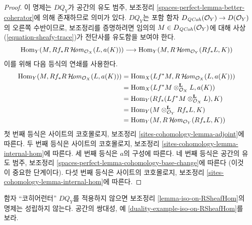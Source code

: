 \begin{proof}
이 명제는 $DQ_Y$가 공간의 유도 범주, 보조정리
\ref{spaces-perfect-lemma-better-coherator}에 의해 존재하므로 의미가 있다.
$DQ_Y$는 포함 함자
$D_{\mathit{QCoh}}(\mathcal{O}_Y) \to D(\mathcal{O}_Y)$의 오른쪽 수반이므로,
보조정리를 증명하려면 임의의
$M \in D_{\mathit{QCoh}}(\mathcal{O}_Y)$에 대해
사상 (\ref{equation-sheafy-trace})가 전단사를 유도함을 보여야 한다.
$$
\mathop{\mathrm{Hom}}\nolimits_Y(M, Rf_*R\mathop{\mathcal{H}\!\mathit{om}}\nolimits_{\mathcal{O}_X}(L, a(K)))
\longrightarrow
\mathop{\mathrm{Hom}}\nolimits_Y(M, R\mathop{\mathcal{H}\!\mathit{om}}\nolimits_{\mathcal{O}_Y}(Rf_*L, K))
$$
이를 위해 다음 등식의 연쇄를 사용한다.
\begin{align*}
\mathop{\mathrm{Hom}}\nolimits_Y(M, Rf_*R\mathop{\mathcal{H}\!\mathit{om}}\nolimits_{\mathcal{O}_X}(L, a(K)))
& =
\mathop{\mathrm{Hom}}\nolimits_X(Lf^*M, R\mathop{\mathcal{H}\!\mathit{om}}\nolimits_{\mathcal{O}_X}(L, a(K))) \\
& =
\mathop{\mathrm{Hom}}\nolimits_X(Lf^*M \otimes_{\mathcal{O}_X}^\mathbf{L} L, a(K)) \\
& =
\mathop{\mathrm{Hom}}\nolimits_Y(Rf_*(Lf^*M \otimes_{\mathcal{O}_X}^\mathbf{L} L), K) \\
& =
\mathop{\mathrm{Hom}}\nolimits_Y(M \otimes_{\mathcal{O}_Y}^\mathbf{L} Rf_*L, K) \\
& =
\mathop{\mathrm{Hom}}\nolimits_Y(M, R\mathop{\mathcal{H}\!\mathit{om}}\nolimits_{\mathcal{O}_Y}(Rf_*L, K))
\end{align*}
첫 번째 등식은 사이트의 코호몰로지, 보조정리
\ref{sites-cohomology-lemma-adjoint}에 따른다.
두 번째 등식은 사이트의 코호몰로지, 보조정리
\ref{sites-cohomology-lemma-internal-hom}에 따른다.
세 번째 등식은 $a$의 구성에 따른다.
네 번째 등식은 공간의 유도 범주, 보조정리
\ref{spaces-perfect-lemma-cohomology-base-change}에 따른다
(이것이 중요한 단계이다).
다섯 번째 등식은 사이트의 코호몰로지, 보조정리
\ref{sites-cohomology-lemma-internal-hom}에 따른다.
\end{proof}

\begin{example}
\label{example-iso-on-RSheafHom}
함자 “코히어런터” $DQ_Y$를 적용하지 않으면
보조정리 \ref{lemma-iso-on-RSheafHom}의 명제는 성립하지 않는다.
공간의 쌍대성, 예 \ref{duality-example-iso-on-RSheafHom}를 보라.
\end{example}

